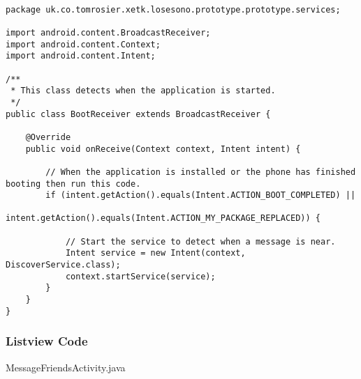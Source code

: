 \begin{lstlisting}

package uk.co.tomrosier.xetk.losesono.prototype.prototype.services;

import android.content.BroadcastReceiver;
import android.content.Context;
import android.content.Intent;

/**
 * This class detects when the application is started.
 */
public class BootReceiver extends BroadcastReceiver {

    @Override
    public void onReceive(Context context, Intent intent) {

        // When the application is installed or the phone has finished booting then run this code.
        if (intent.getAction().equals(Intent.ACTION_BOOT_COMPLETED) ||
                intent.getAction().equals(Intent.ACTION_MY_PACKAGE_REPLACED)) {

            // Start the service to detect when a message is near.
            Intent service = new Intent(context, DiscoverService.class);
            context.startService(service);
        }
    }
}

\end{lstlisting}

\subsubsection*{Listview Code}

MessageFriendsActivity.java

